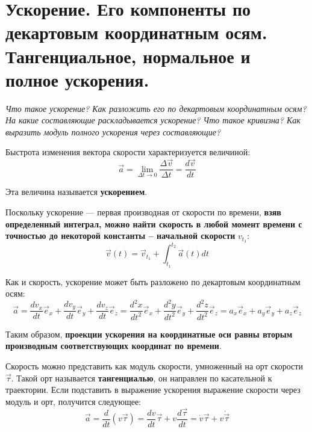 \documentclass{article}
\begin{document}
  \section{Ускорение. Его компоненты по декартовым координатным осям. Тангенциальное, нормальное и полное ускорения.}    
    \par
      \textit{Что такое ускорение? Как разложить его по декартовым координатным осям? На какие составляющие раскладывается ускорение? Что такое кривизна? Как выразить модуль полного ускорения через составляющие?}\\    
    \par
      Быстрота изменения вектора скорости характеризуется величиной:
      \begin{equation}
	\vec a=\lim_{\Delta t\rightarrow 0}{\frac{\Delta \vec v}{\Delta t}}=\frac{d\vec v}{d t}
      \end{equation}
    \par
      Эта величина называется \textbf{ускорением}.
    \par
      Поскольку ускорение --- первая производная от скорости по времени, \textbf{взяв определенный интеграл, можно найти скорость в любой момент времени с точностью до некоторой константы -- начальной скорости} $v_{t_1}$:
      \begin{equation}
	\vec v(t)=\vec v_{t_1}+\int^{t_2}_{t_1}{\vec a(t)dt}
      \end{equation}
    \par
      Как и скорость, ускорение может быть разложено по декартовым координатным осям:
      \begin{equation}
	\vec a = \frac{dv_x}{dt}\vec e_x+\frac{dv_y}{dt}\vec e_y+\frac{dv_z}{dt}\vec e_z = \frac{d^2x}{dt^2}\vec e_x+\frac{d^2y}{dt^2}\vec e_y+\frac{d^2z}{dt^2}\vec e_z =a_x\vec e_x+a_y\vec e_y+a_z\vec e_z
      \end{equation}
    \par
      Таким образом, \textbf{проекции ускорения на координатные оси равны вторым производным соответствующих координат по времени}.
    \par
      Скорость можно представить как модуль скорости, умноженный на орт скорости $\vec \tau$. Такой орт называется \textbf{тангенциалью}, он направлен по касательной к траектории. Если подставить в выражение ускорения выражение скорости через модуль и орт, получится следующее:
      \begin{equation}
	\vec a = \frac{d}{dt}(v\vec \tau) = \frac{dv}{dt}\vec\tau + v\frac{d\vec\tau}{dt} =  \dot{v}\vec \tau + v\dot{\vec \tau}
      \end{equation}
\end{document}
